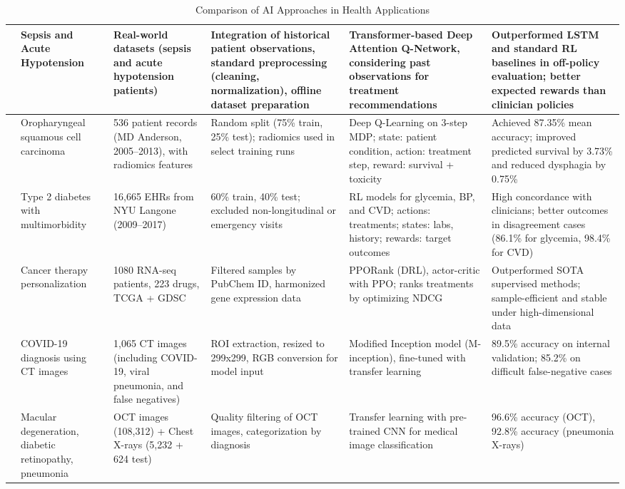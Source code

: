 \begin{table}[htbp]
\begin{adjustwidth}{-2cm}{-2cm}
\begin{tabular}{|p{1.5cm}|p{2.5cm}|p{3cm}|p{3.5cm}|p{2.5cm}|p{2.5cm}|}
\hline
\cite{article_16} & Sepsis and Acute Hypotension & Real-world datasets (sepsis and acute hypotension patients) & Integration of historical patient observations, standard preprocessing (cleaning, normalization), offline dataset preparation & Transformer-based Deep Attention Q-Network, considering past observations for treatment recommendations & Outperformed LSTM and standard RL baselines in off-policy evaluation; better expected rewards than clinician policies \\
\hline
\cite{article_17} & Oropharyngeal squamous cell carcinoma & 536 patient records (MD Anderson, 2005–2013), with radiomics features & Random split (75\% train, 25\% test); radiomics used in select training runs & Deep Q-Learning on 3-step MDP; state: patient condition, action: treatment step, reward: survival + toxicity & Achieved 87.35\% mean accuracy; improved predicted survival by 3.73\% and reduced dysphagia by 0.75\% \\
\hline
\cite{article_18} & Type 2 diabetes with multimorbidity & 16,665 EHRs from NYU Langone (2009–2017) & 60\% train, 40\% test; excluded non-longitudinal or emergency visits & RL models for glycemia, BP, and CVD; actions: treatments; states: labs, history; rewards: target outcomes & High concordance with clinicians; better outcomes in disagreement cases (86.1\% for glycemia, 98.4\% for CVD) \\
\hline
\cite{article_19} & Cancer therapy personalization & 1080 RNA-seq patients, 223 drugs, TCGA + GDSC & Filtered samples by PubChem ID, harmonized gene expression data & PPORank (DRL), actor-critic with PPO; ranks treatments by optimizing NDCG & Outperformed SOTA supervised methods; sample-efficient and stable under high-dimensional data \\
\hline
\cite{article_20} & COVID-19 diagnosis using CT images & 1,065 CT images (including COVID-19, viral pneumonia, and false negatives) & ROI extraction, resized to 299x299, RGB conversion for model input & Modified Inception model (M-inception), fine-tuned with transfer learning & 89.5\% accuracy on internal validation; 85.2\% on difficult false-negative cases \\
\hline
\cite{article_21} & Macular degeneration, diabetic retinopathy, pneumonia & OCT images (108,312) + Chest X-rays (5,232 + 624 test) & Quality filtering of OCT images, categorization by diagnosis & Transfer learning with pre-trained CNN for medical image classification & 96.6\% accuracy (OCT), 92.8\% accuracy (pneumonia X-rays) \\
\hline
\end{tabular}
\caption{Comparison of AI Approaches in Health Applications}
\label{tab:ai_health_comparison}
\end{adjustwidth}
\end{table}
